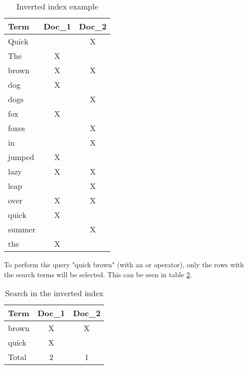 \begin{table}[H]
    \centering
    \begin{tabular}{ | l | c | c | }
        \hline
        Term    & Doc\_1 & Doc\_2 \\ \hline
        \hline
        Quick   &       &   X   \\
        The     &   X   &       \\
        brown   &   X   &   X   \\
        dog     &   X   &       \\
        dogs    &       &   X   \\
        fox     &   X   &       \\
        foxes   &       &   X   \\
        in      &       &   X   \\
        jumped  &   X   &       \\
        lazy    &   X   &   X   \\
        leap    &       &   X   \\
        over    &   X   &   X   \\
        quick   &   X   &       \\
        summer  &       &   X   \\
        the     &   X   &       \\
        \hline
    \end{tabular}
    \caption{Inverted index example \autocite{elasticsearch_iindex}}
    \label{tab:iindex1}
\end{table}

To perform the query "quick brown" (with an or operator), only the rows with the search terms will be selected. This can be seen in table \ref{tab:iindex2}.

\begin{table}[H]
    \centering
    \begin{tabular}{ | l | c | c | }
        \hline
        Term    & Doc\_1 & Doc\_2 \\ \hline
        \hline
        brown   &   X   &   X   \\
        quick   &   X   &       \\
        \hline
        Total   &   2   &   1   \\
        \hline
    \end{tabular}
    \caption{Search in the inverted index \autocite{elasticsearch_iindex}}
    \label{tab:iindex2}
\end{table}

